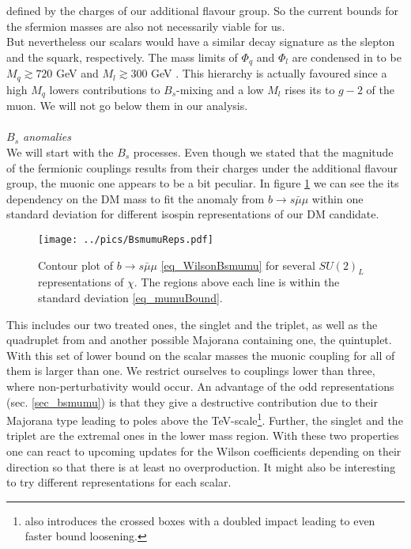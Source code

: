 defined by the charges of our additional flavour group. So the current bounds for the sfermion masses are also not necessarily viable for us.\\
\noindent But nevertheless our scalars would have a similar decay signature as the slepton and the squark, respectively. The mass limits of $\Phi_q$
and $\Phi_l$ are condensed in \cite{Grip} to be $M_q \gtrsim 720$ GeV \cite{1506.08616} and $M_l \gtrsim 300$ GeV \cite{1403.5294}. This hierarchy is
actually favoured since a high $M_q$ lowers contributions to $B_s$-mixing and a low $M_l$ rises its to $g-2$ of the muon. We will not go 
below them in our analysis. 
\\ \\ \textit{$B_s$ anomalies}\\
\noindent We will start with the $B_s$ processes. Even though we stated that the magnitude of the fermionic couplings results from their charges
under the additional flavour group, the muonic one appears to be a bit peculiar. In figure \ref{pic_BsMumuReps} we can see the its dependency on
the DM mass to fit the anomaly from $b\rightarrow s\bar\mu\mu$  within one standard deviation for different isospin representations of our DM
candidate. 
\begin{figure}[t]
 \texttt{[image: ../pics/BsmumuReps.pdf]}
 \caption{Contour plot of $b\rightarrow s\bar\mu\mu$  \eqref{eq_WilsonBsmumu} for several $SU(2)_L$ representations of $\chi$. The regions above each 
 line is within the standard deviation \eqref{eq_mumuBound}.}
 \label{pic_BsMumuReps}
\end{figure}
This includes our two treated ones, the singlet and the triplet, as well as the quadruplet from \cite{Grip} and another possible Majorana
containing one, the quintuplet. With this set of lower bound on the scalar masses the muonic coupling for all of them is larger than one. We restrict
ourselves to couplings lower than three, where non-perturbativity would occur. An advantage of the odd representations (sec. \ref{sec_bsmumu}) is
that they give a destructive contribution due to their Majorana type leading to poles above the TeV-scale\footnote{\cite{1608.07832} also introduces
the crossed boxes with a doubled impact leading to even faster bound loosening.}. Further, the singlet and the triplet
are the extremal ones in the lower mass region. With these two properties one can react to upcoming updates for the Wilson coefficients depending
on their direction so that there is at least no overproduction. It might also be interesting to try different representations for each scalar.
